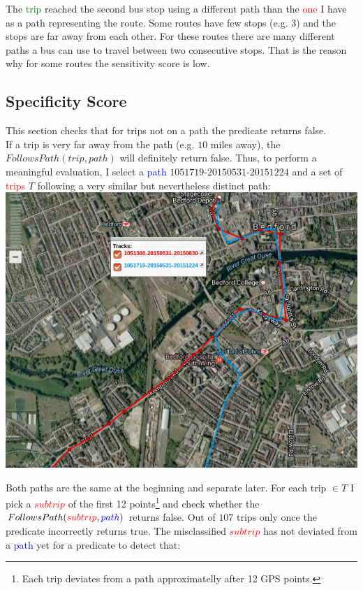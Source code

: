 \documentclass[12pt,a4paper,oneside,openright]{report}
\begin{document}
The \textcolor{green}{trip} reached the second bus stop using a different path
than the \textcolor{red}{one} I have as a path representing the route.
Some routes have few stops (e.g. 3) and the stops are far away from each other.
For these routes there are many different paths a bus can use to travel
between two consecutive stops. That is the reason why for some routes the
sensitivity score is low.

\subsection{Specificity Score}

This section checks that for trips not on a path the predicate returns false. \\

If a trip is very far away from the path (e.g. $10$ miles away), the
$FollowsPath(trip, path)$ will definitely return false. Thus, to perform
a meaningful evaluation, I select a \textcolor{blue}{path}
$1051719$-$20150531$-$20151224$ and a set of \textcolor{red}{trips}
$T$ following a very similar but nevertheless distinct path: \\

\includegraphics[scale = 0.6]{figs/similar_paths.png}

Both paths are the same at the beginning and separate later. For each
trip $\in T$ I pick a \textcolor{red}{$subtrip$} of the first 12
points\footnote{Each trip deviates from a path approximatelly after 12 GPS
points.} and check whether the
$FollowsPath(\textcolor{red}{subtrip}, \textcolor{blue}{path})$ 
returns false. Out of $107$ trips only once the predicate incorrectly returns
true. The misclassified \textcolor{red}{$subtrip$} has not deviated from a
\textcolor{blue}{path} yet for a predicate to detect that: \\
\end{document}
